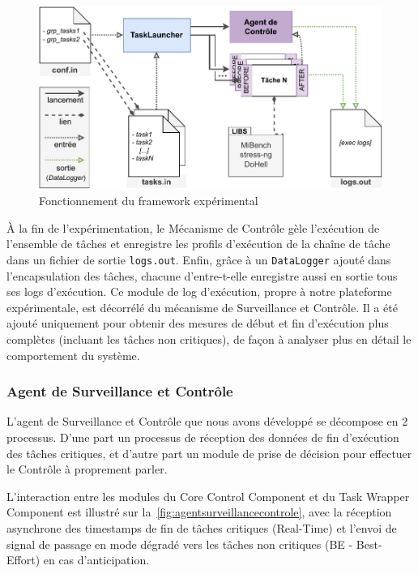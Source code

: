 \documentclass[french, a4paper, 11pt, twoside, pdftex]{StyleThese}
\begin{document}
    \begin{figure}[ht]
    	\centering
    	\includegraphics[width=\linewidth]{schemas/Implementation_Archi}
    	\caption{Fonctionnement du framework expérimental}
    	\label{fig:implementationarchi}
    \end{figure}

\pagebreak 
    À la fin de l'expérimentation, le Mécanisme de Contrôle gèle l'exécution de l'ensemble de tâches et enregistre les profils d'exécution de la chaîne de tâche dans un fichier de sortie \texttt{logs.out}.  Enfin, grâce à un \texttt{DataLogger} ajouté dans l'encapsulation des tâches, chacune d'entre-t-elle enregistre aussi en sortie tous ses logs d'exécution. Ce module de log d'exécution, propre à notre plateforme expérimentale, est décorrélé du mécanisme de Surveillance et Contrôle. Il a été ajouté uniquement pour obtenir des mesures de début et fin d'exécution plus complètes (incluant les tâches non critiques), de façon à analyser plus en détail le comportement du système.
        
    	\subsubsection{Agent de Surveillance et Contrôle}

	L'agent de Surveillance et Contrôle que nous avons développé se décompose en 2 processus. D'une part un processus de réception des données de fin d'exécution des tâches critiques, et d'autre part un module de prise de décision pour effectuer le Contrôle à proprement parler.
	
	L’interaction entre les modules du Core Control Component et du Task Wrapper Component est illustré sur la~\autoref{fig:agentsurveillancecontrole}, avec la réception asynchrone des timestamps de fin de tâches critiques (Real-Time) et l'envoi de signal de passage en mode dégradé vers les tâches non critiques (BE - Best-Effort) en cas d'anticipation.
\end{document}
